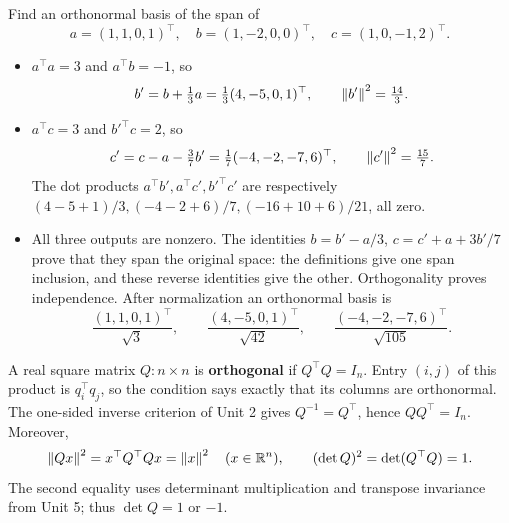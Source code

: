 \begin{example}\label{example:06:gs}
Find an orthonormal basis of the span of
\[
a=(1,1,0,1)^\top,\quad b=(1,-2,0,0)^\top,\quad c=(1,0,-1,2)^\top.
\]
\par\smallskip
{}
\begin{itemize}
\item \(a^\top a=3\) and \(a^\top b=-1\), so
  \[
  b'=b+\tfrac13a=\tfrac13(4,-5,0,1)^\top,
  \qquad \left\lVert b'\right\rVert^2=\tfrac{14}{3}.
  \]
\item \(a^\top c=3\) and \(b'^\top c=2\), so
  \[
  c'=c-a-\tfrac37b'=\tfrac17(-4,-2,-7,6)^\top,
  \qquad \left\lVert c'\right\rVert^2=\tfrac{15}{7}.
  \]
  The dot products \(a^\top b',a^\top c',b'^\top c'\) are respectively
  \((4-5+1)/3,(-4-2+6)/7,(-16+10+6)/21\), all zero.
\item All three outputs are nonzero. The identities
  \(b=b'-a/3\), \(c=c'+a+3b'/7\) prove that they span the original
  space: the definitions give one span inclusion, and these reverse
  identities give the other. Orthogonality proves independence.
  After normalization an orthonormal basis is
  \[
  \frac{(1,1,0,1)^\top}{\sqrt3},\qquad
  \frac{(4,-5,0,1)^\top}{\sqrt{42}},\qquad
  \frac{(-4,-2,-7,6)^\top}{\sqrt{105}}.
  \]
\end{itemize}
\end{example}

A real square matrix \(Q:n\times n\)
is \textbf{orthogonal} if \(Q^\top Q=I_n\). Entry \((i,j)\) of this
product is \(q_i^\top q_j\), so the condition says exactly that its columns
are orthonormal. The one-sided inverse criterion of Unit 2 gives
\(Q^{-1}=Q^\top\), hence \(QQ^\top=I_n\). Moreover,
\[
\left\lVert Qx\right\rVert^2=x^\top Q^\top Qx=\left\lVert x\right\rVert^2\quad(x\in\mathbb R^n),\qquad
(\det Q)^2=\det(Q^\top Q)=1.
\]
The second equality uses determinant multiplication and transpose
invariance from Unit 5; thus \(\det Q=1\) or \(-1\).

